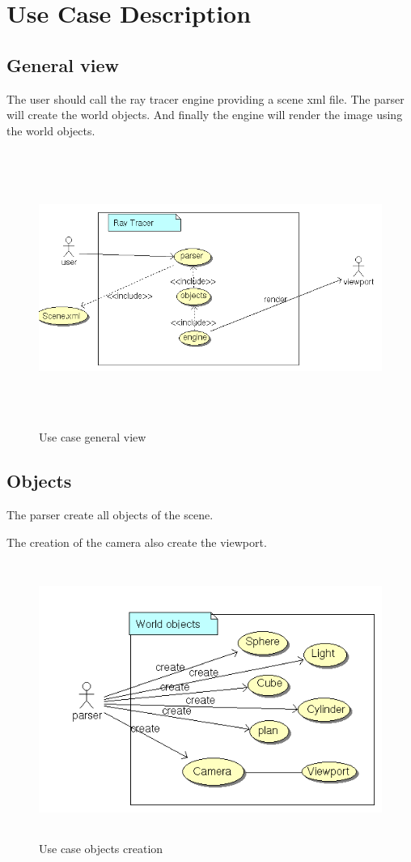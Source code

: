 \section{Use Case Description}
  \subsection{General view}
The user should call the ray tracer engine providing a scene xml file. The parser will create the world objects. And finally the engine will render the image using the world objects.

\begin{figure}[ht]
  \centering
  \includegraphics[height=9cm]{img/uc_raytracer.png}
  \caption{Use case general view}
  \label{img_uc_rt}
\end{figure}

  \clearpage
  \subsection{Objects}

The parser create all objects of the scene.

The creation of the camera also create the viewport.

\begin{figure}[ht]
  \centering
  \includegraphics[height=9cm]{img/uc_objects.png}
  \caption{Use case objects creation}
  \label{img_uc_obj}
\end{figure}

